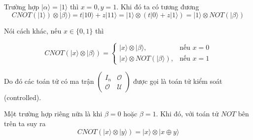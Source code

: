 Trường hợp $\lvert \alpha \rangle = \lvert 1 \rangle$ thì $x = 0, y = 1$. Khi đó ta có tương đương 
\begin{equation*}
    CNOT (\lvert 1 \rangle) \otimes \lvert \beta \rangle) = t \lvert 10 \rangle + z \lvert 11 \rangle = \lvert 1 \rangle \otimes (t \lvert 0 \rangle + z \lvert 1 \rangle) = \lvert 1 \rangle \otimes NOT(\lvert \beta \rangle)
\end{equation*}

Nói cách khác, nếu $x \in \{ 0, 1 \}$ thì 

\begin{equation*}
    CNOT (\lvert x \rangle \otimes \lvert \beta \rangle) = 
    \begin{cases}
        \lvert x \rangle \otimes \lvert \beta \rangle, & \text{nếu } x = 0 \\ 
        \lvert x \rangle \otimes NOT(\lvert \beta \rangle), & \text{nếu } x = 1
    \end{cases}
\end{equation*}

Do đó các toán tử có ma trận $\begin{pmatrix}
    I_n & \mathcal{O} \\ \mathcal{O} & \mathcal{U}
\end{pmatrix}$ được gọi là toán tử kiểm soát (controlled).

Một trường hợp riêng nữa là khi $\beta = 0$ hoặc $\beta = 1$. Khi đó, với toán tử $NOT$ bên trên ta suy ra 
\begin{equation*}
    CNOT (\lvert x \rangle \otimes \lvert y \rangle) = \lvert x \rangle \otimes \lvert x \oplus y \rangle
\end{equation*}
